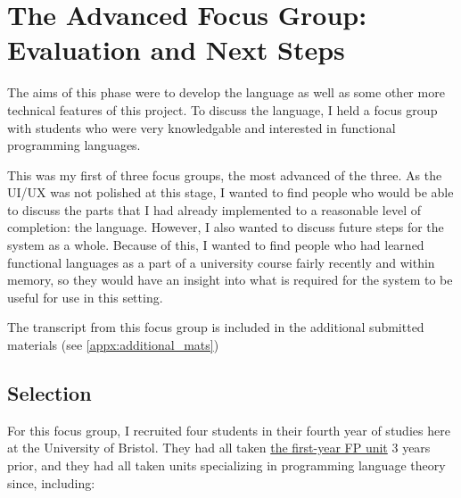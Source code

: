 \section{The Advanced Focus Group: Evaluation and Next Steps}
\label{ref:afg_figma}
\label{ref:afg}
The aims of this phase were to develop the language as well as some other more technical features of this project. To discuss the language, I held a focus group with students who were very knowledgable and interested in functional programming languages. 

This was my first of three focus groups, the most advanced of the three. As the UI/UX was not polished at this stage, I wanted to find people who would be able to discuss the parts that I had already implemented to a reasonable level of completion: the language. However, I also wanted to discuss future steps for the system as a whole. Because of this, I wanted to find people who had learned functional languages as a part of a university course fairly recently and within memory, so they would have an insight into what is required for the system to be useful for use in this setting. 

The transcript from this focus group is included in the additional submitted materials (see \ref{appx:additional_mats})

\subsection{Selection}

For this focus group, I recruited four students in their fourth year of studies here at the University of Bristol. They had all taken \hyperref[COMS10016]{the first-year FP unit} 3 years prior, and they had all taken units specializing in programming language theory since, including:

